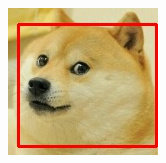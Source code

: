 \documentclass[conference,compsoc]{IEEEtran}
\begin{document}
\begin{figure}
\begin{multicols}{4}
    		\includegraphics[height=1.35\linewidth]{dogeFace.jpg}\par 

\end{multicols}
\end{figure}
\end{document}
